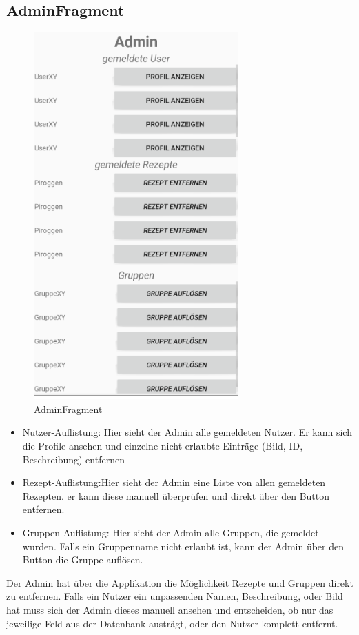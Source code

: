 \subsection{AdminFragment}
\begin{figure}[H]
	\centering
	\includegraphics[width=0.7\textwidth]{pics/adminFragment.png}%
	\caption{AdminFragment}%
	\label{view}%
\end{figure}

\begin{itemize}[nosep]
	\item Nutzer-Auflistung: Hier sieht der Admin alle gemeldeten Nutzer. Er kann sich die Profile ansehen und einzelne nicht erlaubte Einträge (Bild, ID, Beschreibung) entfernen
	\item Rezept-Auflistung:Hier sieht der Admin eine Liste von allen gemeldeten Rezepten. er kann diese manuell überprüfen und direkt über den Button entfernen. 
	\item Gruppen-Auflistung: Hier sieht der Admin alle Gruppen, die gemeldet wurden. Falls ein Gruppenname nicht erlaubt ist, kann der Admin über den Button die Gruppe auflösen.
\end{itemize}
Der Admin hat über die Applikation die Möglichkeit Rezepte und Gruppen direkt zu entfernen. Falls ein Nutzer ein unpassenden Namen, Beschreibung, oder Bild hat muss sich der Admin dieses manuell ansehen und entscheiden, ob nur das jeweilige Feld aus der Datenbank austrägt, oder den Nutzer komplett entfernt.

